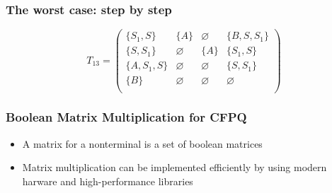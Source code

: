 \documentclass[xcolor=table]{beamer}
\begin{document}
\begin{frame}[noframenumbering]

  \frametitle{The worst case: step by step}

\begin{figure}[h]
\[
T_{13} = \begin{pmatrix}
\{S_1, S\}     & \{A\}       & \varnothing & \{B, S, S_1\}    \\
\{S, S_1\}       & \varnothing & \{A\}       & \{S_1, S\}     \\
\{A, S_1, S\}  & \varnothing & \varnothing & \{S, S_1\} \\
\{B\}       & \varnothing & \varnothing & \varnothing \\
\end{pmatrix}
\]
\label{ExampleQueryFirstIteration}
\end{figure}
\end{frame}


\begin{frame} \frametitle{Boolean Matrix Multiplication for CFPQ}
  \begin{itemize}
    \item A matrix for a nonterminal is a set of boolean matrices
    \item Matrix multiplication can be implemented efficiently by using modern harware and high-performance libraries
  \end{itemize}
\end{frame}
\end{document}

